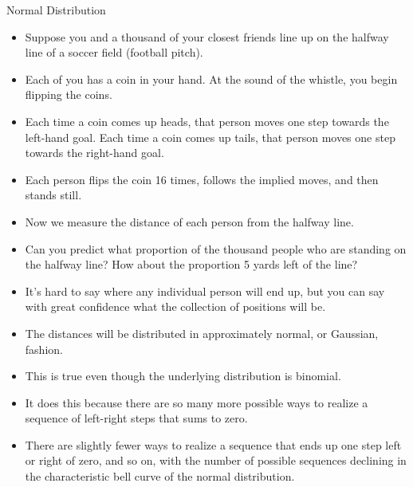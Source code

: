 \documentclass[handout]{beamer}
\begin{document}
\begin{frame}{Normal Distribution}

\scriptsize{
\begin{itemize}
 \item  Suppose you and a thousand of your closest friends line up on the halfway line of a soccer field (football pitch).
 \item Each of you has a coin in your hand. At the sound of the whistle, you begin flipping the coins. 
 \item Each time a coin comes up heads, that person moves one step
towards the left-hand goal. Each time a coin comes up tails, that person moves one step towards the right-hand goal. 
\item Each person flips the coin 16 times, follows the implied moves,
and then stands still.
\item Now we measure the distance of each person from the halfway line.
\item Can you predict what proportion of the thousand people who are standing on the halfway line? How about the proportion 5 yards left of the line?
\item It’s hard to say where any individual person will end up, but you can say with great confidence what the collection of positions will be. 
\item The distances will be distributed in approximately normal, or Gaussian, fashion.
\item This is true even though the underlying distribution is binomial. 
\item It does this because there are so many more possible ways to realize a sequence of left-right steps that sums to zero. 
\item There are slightly fewer ways to realize a sequence that ends
up one step left or right of zero, and so on, with the number of possible sequences declining in the characteristic bell curve of the normal distribution.
 \end{itemize}}
 
 \end{frame}
 
\end{document}
